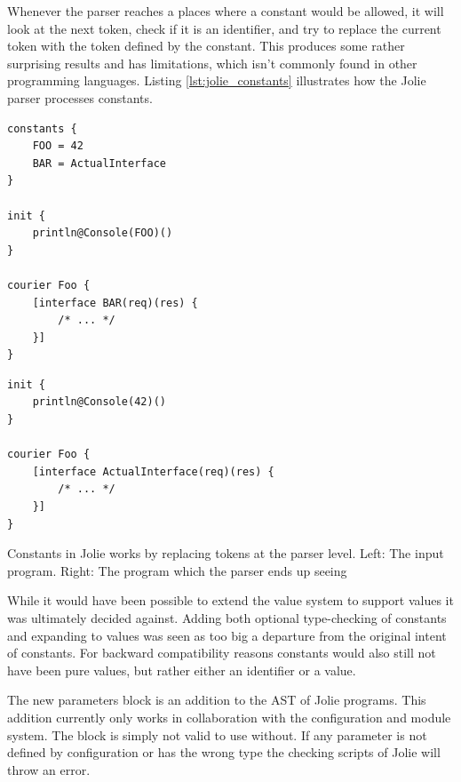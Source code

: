 Whenever the parser reaches a places where a constant would be allowed, it will
look at the next token, check if it is an identifier, and try to replace the
current token with the token defined by the constant. This produces some rather
surprising results and has limitations, which isn't commonly found in other
programming languages.  Listing \ref{lst:jolie_constants} illustrates how the
Jolie parser processes constants.

\begin{listing}[H]
\begin{multicols}{2}

\begin{verbatim}
constants {
    FOO = 42
    BAR = ActualInterface
}

init {
    println@Console(FOO)()
}

courier Foo {
    [interface BAR(req)(res) {
        /* ... */
    }]
}
\end{verbatim}

\columnbreak

\begin{verbatim}
init {
    println@Console(42)()
}

courier Foo {
    [interface ActualInterface(req)(res) {
        /* ... */
    }]
}
\end{verbatim}

\end{multicols}

\caption{Constants in Jolie works by replacing tokens at the parser level. Left:
    The input program. Right: The program which the parser ends up seeing}

\label{lst:jolie_constants}

\end{listing}

While it would have been possible to extend the value system to support values
it was ultimately decided against. Adding both optional type-checking of
constants and expanding to values was seen as too big a departure from the
original intent of constants. For backward compatibility reasons constants
would also still not have been pure values, but rather either an identifier or
a value.

The new parameters block is an addition to the AST of Jolie programs. This
addition currently only works in collaboration with the configuration and
module system. The block is simply not valid to use without. If any parameter
is not defined by configuration or has the wrong type the checking scripts of
Jolie will throw an error.

